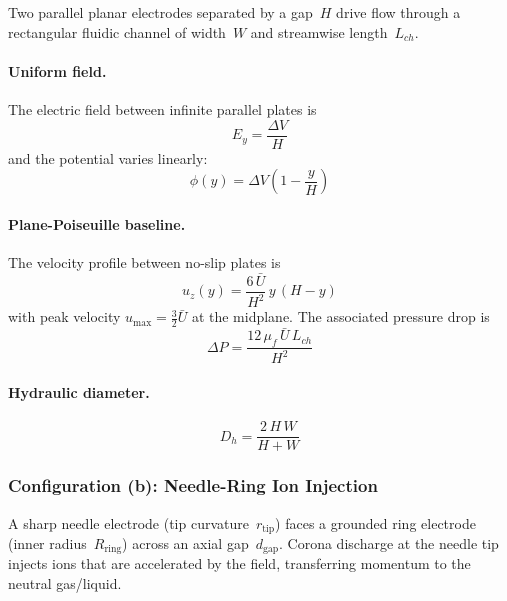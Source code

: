 \documentclass[11pt,a4paper]{article}
\begin{document}
Two parallel planar electrodes separated by a gap~$H$ drive flow through a
rectangular fluidic channel of width~$W$ and streamwise length~$L_{ch}$.

\paragraph{Uniform field.}
The electric field between infinite parallel plates is
\begin{equation}\label{eq:planar_field}
  E_y = \frac{\Delta V}{H}
\end{equation}
and the potential varies linearly:
\begin{equation}\label{eq:planar_phi}
  \phi(y) = \Delta V\!\left(1 - \frac{y}{H}\right)
\end{equation}

\paragraph{Plane-Poiseuille baseline.}
The velocity profile between no-slip plates is
\begin{equation}\label{eq:plane_poiseuille}
  u_z(y) = \frac{6\,\bar{U}}{H^2}\,y\,(H - y)
\end{equation}
with peak velocity $u_{\max} = \tfrac{3}{2}\bar{U}$ at the midplane.  The
associated pressure drop is
\begin{equation}\label{eq:plane_dp}
  \Delta P = \frac{12\,\mu_f\,\bar{U}\,L_{ch}}{H^2}
\end{equation}

\paragraph{Hydraulic diameter.}
\begin{equation}\label{eq:D_h_rect}
  D_h = \frac{2\,H\,W}{H + W}
\end{equation}

\subsubsection{Configuration (b): Needle-Ring Ion Injection}

A sharp needle electrode (tip curvature~$r_{\mathrm{tip}}$) faces a grounded
ring electrode (inner radius~$R_{\mathrm{ring}}$) across an axial
gap~$d_{\mathrm{gap}}$.  Corona discharge at the needle tip injects ions that
are accelerated by the field, transferring momentum to the neutral gas/liquid.
\end{document}
